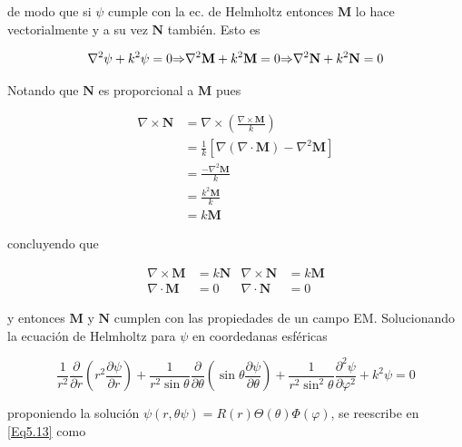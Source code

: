 \documentclass[a4paper,10pt]{article}
\newcommand{\parcial}[1]{\frac{\partial}{\partial {#1}}}	%
\begin{document}
de modo que si $\psi$ cumple con la ec. de Helmholtz entonces $\textbf{M}$ lo hace vectorialmente y a su vez $\textbf{N}$ también. Esto es

\begin{equation}
\nabla^2\psi+k^2\psi=0 \text{$ \Rightarrow $} \nabla^2\textbf{M}+k^2\textbf{M}=0 \text{$ \Rightarrow $} \nabla^2\textbf{N}+k^2\textbf{N}=0
\end{equation}

Notando que $\textbf{N}$ es proporcional a $\textbf{M}$ pues

\begin{subequations}
\begin{align}
\nabla\times\textbf{N}
&=\nabla\times\left(\frac{\nabla\times\textbf{M}}{k}\right)	\\
&=\frac{1}{k}[\nabla(\nabla\cdot\textbf{M})-\nabla^2\textbf{M}]	\\
&=\frac{-\nabla^2\textbf{M}}{k}	\\
&=\frac{k^2\textbf{M}}{k}	\\
&=k\textbf{M}
\end{align}
\end{subequations}

concluyendo que

\begin{subequations}
\begin{align}
\nabla\times\textbf{M}&=k\textbf{N}	&\nabla\times\textbf{N}&=k\textbf{M}	\\
\nabla\cdot\textbf{M}&=0					&\nabla\cdot\textbf{N}&=0
\end{align}
\label{Eq5.12}
\end{subequations}

y entonces $\textbf{M}$ y $\textbf{N}$ cumplen con las propiedades de un campo EM. Solucionando la ecuación de Helmholtz para $\psi$ en coordedanas esféricas

\begin{equation}
\frac{1}{r^2}\parcial{r}\left(r^2\frac{\partial \psi}{\partial r}\right)+\frac{1}{r^2\sin\theta}\parcial{\theta}\left(\sin\theta\frac{\partial\psi}{\partial\theta}\right)+\frac{1}{r^2\sin^2\theta}\frac{\partial^2\psi}{\partial\varphi^2}+k^2\psi=0
\label{Eq5.13}
\end{equation}

proponiendo la solución $\psi(r,\theta\psi)=R(r)\Theta(\theta)\Phi(\varphi)$, se reescribe en \eqref{Eq5.13} como
\end{document}
